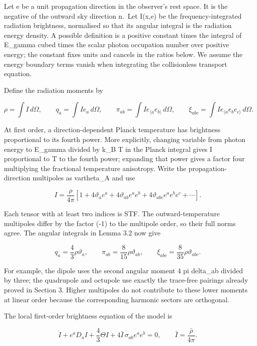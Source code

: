 \documentclass[
  11pt,
  a4paper]{article}
\begin{document}
Let e be a unit propagation direction in the observer's rest space. It is the negative of the outward sky direction n.~Let I(x,e) be the frequency-integrated radiation brightness, normalised so that its angular integral is the radiation energy density. A possible definition is a positive constant times the integral of E\_gamma cubed times the scalar photon occupation number over positive energy; the constant fixes units and cancels in the ratios below. We assume the energy boundary terms vanish when integrating the collisionless transport equation.

Define the radiation moments by

\[
\rho=\int I\,d\Omega,\qquad q_a=\int I e_a\,d\Omega,\qquad
\pi_{ab}=\int I e_{\langle a}e_{b\rangle}\,d\Omega,
\qquad
\xi_{abc}=\int I e_{\langle a}e_be_{c\rangle}\,d\Omega.
\tag{E.1}
\]

At first order, a direction-dependent Planck temperature has brightness proportional to its fourth power. More explicitly, changing variable from photon energy to E\_gamma divided by k\_B T in the Planck integral gives I proportional to T to the fourth power; expanding that power gives a factor four multiplying the fractional temperature anisotropy. Write the propagation-direction multipoles as vartheta\_A and use

\[
I=\frac{\rho}{4\pi}\left[1+4\vartheta_a e^a
+4\vartheta_{ab}e^ae^b+4\vartheta_{abc}e^ae^be^c+\cdots\right].
\tag{E.2}
\]

Each tensor with at least two indices is STF. The outward-temperature multipoles differ by the factor (-1) to the multipole order, so their full norms agree. The angular integrals in Lemma 3.2 now give

\[
q_a=\frac43\rho\vartheta_a,\qquad
\pi_{ab}=\frac8{15}\rho\vartheta_{ab},\qquad
\xi_{abc}=\frac8{35}\rho\vartheta_{abc}.
\tag{E.3}
\]

For example, the dipole uses the second angular moment 4 pi delta\_ab divided by three; the quadrupole and octupole use exactly the trace-free pairings already proved in Section 3. Higher multipoles do not contribute to these lower moments at linear order because the corresponding harmonic sectors are orthogonal.

The local first-order brightness equation of the model is

\[
\dot I+e^aD_a I+\frac43\Theta I
+4\bar I\,\sigma_{ab}e^ae^b=0,
\qquad \bar I=\frac{\bar\rho}{4\pi}.
\tag{E.4}
\]
\end{document}
